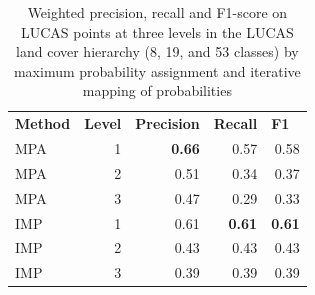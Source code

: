     \begin{table}[H!]
    \begin{tabular}{lrrrr}
    \textbf{Method} & \multicolumn{1}{l}{\textbf{Level}} & \multicolumn{1}{l}{\textbf{Precision}} & \multicolumn{1}{l}{\textbf{Recall}} & \multicolumn{1}{l}{\textbf{F1}} \\
    MPA & 1 & \textbf{0.66} & 0.57 & 0.58 \\
    MPA & 2 & 0.51 & 0.34 & 0.37 \\
    MPA & 3 & 0.47 & 0.29 & 0.33 \\
    IMP & 1 & 0.61 & \textbf{0.61} & \textbf{0.61} \\
    IMP & 2 & 0.43 & 0.43 & 0.43 \\
    IMP & 3 & 0.39 & 0.39 & 0.39
    \end{tabular}
    \caption{Weighted precision, recall and F1-score on LUCAS points at three levels in the LUCAS land cover hierarchy (8, 19, and 53 classes) by maximum probability assignment and iterative mapping of probabilities}
    \label{tab:05_calibration_accuracy}
    \end{table}

